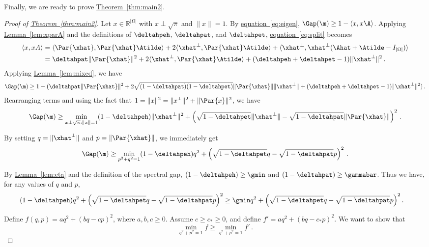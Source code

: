 \documentclass[11pt]{article}
\providecommand{\R}{{\mathbb R}}
\providecommand{\expref}[2]{\texorpdfstring{\hyperref[#2]{#1~\ref{#2}}}{#1~\ref{#2}}}
\providecommand{\expeqref}[2]{\texorpdfstring{\hyperref[#2]{#1~\eqref{#2}}}{#1~\eqref{#2}}}
\providecommand{\Perp}[1]{#1^{\perp}}
\begin{document}
Finally, we are ready to prove \expref{Theorem}{thm:main2}. 

%
%
%
\begin{proof}[Proof of \expref{Theorem}{thm:main2}]
Let $x\in \R^{|\Omega|}$ with $x\perp \sqrt{\pi}$ and $\|x\|=1$.  By \expeqref{equation}{eq:eigen}, 
$\Gap(\m) \geq 1-\langle x,x\A\rangle$.  
Applying \expref{Lemma}{lem:xparA} and the definitions of $\deltahpeh$, $\deltahpat$,
and $\deltahpet$, \expeqref{equation}{eq:split} becomes
\begin{align}
 \langle {x},{x}A\rangle&=  \langle \Par{\xhat},\Par{\xhat}\Atilde\rangle +2
  \langle\Perp{\xhat},\Par{\xhat}\Atilde\rangle
  +\langle\Perp{\xhat},\Perp{\xhat}(\Ahat+\Atilde-I_{|\Omega|})\rangle\nonumber\\
  &= \deltahpat \|\Par{\xhat}\|^2 +2 \langle\Perp{\xhat},\Par{\xhat}\Atilde\rangle
  +(\deltahpeh +\deltahpet -1)\|\Perp{\xhat}\|^2\,.\label{eq:strongestbound}
\end{align}
Applying \expref{Lemma}{lem:mixed}, we have
\[ \Gap(\m) \geq 1 - (\deltahpat \|\Par{\xhat}\|^2 + 
2 \sqrt{(1-\deltahpat)(1-\deltahpet)}\|\Par{\xhat}\|\|\Perp{\xhat}\|
+(\deltahpeh +\deltahpet -1)\|\Perp{\xhat}\|^2)\,.
\]
Rearranging terms and using the fact that
$1=\|x\|^2=\|\Perp{x}\|^2+\|\Par{x}\|^2$, we have
\begin{equation}\label{eq:main}
\Gap(\m) \geq \min_{x\perp\sqrt{\pi}:\|x\|=1} 
(1-\deltahpeh)\|\Perp{\xhat}\|^2+\left(\sqrt{1-\deltahpet}\|\Perp{\xhat}\| - \sqrt{1-\deltahpat}\|\Par{\xhat}\|\right)^2\,.
\end{equation}

By setting $q=\|\Perp{\xhat}\|$ and $p=\|\Par{\xhat}\|$, we immediately get
\[\Gap(\m) \geq \min_{p^2+q^2=1} 
(1-\deltahpeh)q^2+\left(\sqrt{1-\deltahpet}q - \sqrt{1-\deltahpat}p\right)^2\,.\] 


By \expref{Lemma}{lem:eta} and the definition of the spectral gap, $(1-\deltahpeh)\geq \gmin$ and
 $(1-\deltahpat)\geq \gammabar$.   Thus we have, for any values of $q$ and $p$, 
\begin{align*}
(1-\deltahpeh)q^2+\left(\sqrt{1-\deltahpet}q - \sqrt{1-\deltahpat}p\right)^2
&\geq \gmin q^2+\left(\sqrt{1-\deltahpet}q - \sqrt{1-\deltahpat}p\right)^2.
\end{align*}


Define $f(q,p) = a q^2 + (bq-cp)^2$, where $a,b,c\geq 0$.  Assume $c\geq c_*\geq 0$, and define $f'= a q^2 + (bq-c_*p)^2$.  We want to show that
\begin{equation}\label{eq:lowerbound}
 \min_{q^2+p^2=1} f \geq  \min_{q^2+p^2=1} f'\,.
\end{equation}


\end{proof}
\end{document}
